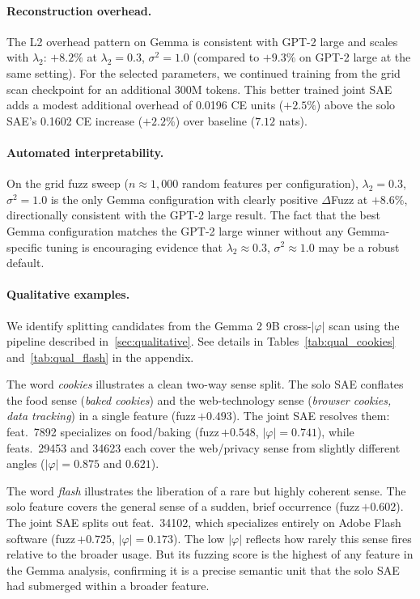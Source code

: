 \documentclass{article} %
\begin{document}
\paragraph{Reconstruction overhead.}
The L2 overhead pattern on Gemma is consistent with GPT-2 large and scales
with $\lambda_2$: $+8.2\%$ at $\lambda_2\!=\!0.3$, $\sigma^2\!=\!1.0$
(compared to $+9.3\%$ on GPT-2 large at the same setting).
For the selected parameters, we continued training from the grid scan
checkpoint for an additional 300M tokens. This better trained joint SAE adds
a modest additional overhead of 0.0196 CE units ($+2.5\%$)
above the solo SAE's 0.1602 CE increase ($+2.2\%$) over baseline ($7.12$ nats).

\paragraph{Automated interpretability.}
\label{sec:gemma_fuzz}
On the grid fuzz sweep ($n\!\approx\!1{,}000$ random features per configuration),
$\lambda_2\!=\!0.3$, $\sigma^2\!=\!1.0$ is the only Gemma configuration with
clearly positive $\Delta$Fuzz at $+8.6\%$, directionally consistent with
the GPT-2 large result.
The fact that the best Gemma configuration matches the GPT-2 large winner
without any Gemma-specific tuning is encouraging evidence that
$\lambda_2\!\approx\!0.3$, $\sigma^2\!\approx\!1.0$ may be a robust default.

\paragraph{Qualitative examples.}
We identify splitting candidates from the Gemma 2 9B cross-$|\varphi|$ scan
using the pipeline described in~\ref{sec:qualitative}. See details in
Tables~\ref{tab:qual_cookies} and~\ref{tab:qual_flash} in the appendix.

The word \textit{cookies} illustrates a clean two-way sense split.
The solo SAE conflates the food sense (\textit{baked cookies}) and the
web-technology sense (\textit{browser cookies, data tracking}) in a single
feature (fuzz\,$+0.493$).
The joint SAE resolves them: feat.\ 7892 specializes on food/baking
(fuzz\,$+0.548$, $|\varphi|\!=\!0.741$), while feats.\ 29453 and 34623
each cover the web/privacy sense from slightly different angles
($|\varphi|\!=\!0.875$ and $0.621$).

The word \textit{flash} illustrates the liberation of a rare but highly
coherent sense.
The solo feature covers the general sense of a sudden, brief occurrence
(fuzz\,$+0.602$).
The joint SAE splits out feat.\ 34102, which specializes entirely on
Adobe Flash software (fuzz\,$+0.725$, $|\varphi|\!=\!0.173$).
The low $|\varphi|$ reflects how rarely this sense fires relative to
the broader usage. But its fuzzing score is the highest of any feature in
the Gemma analysis, confirming it is a precise semantic unit that the solo
SAE had submerged within a broader feature.
\end{document}

